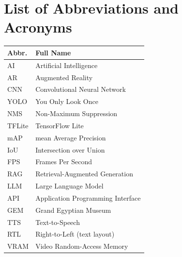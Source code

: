 \chapter*{List of Abbreviations and Acronyms}

\begin{center}
\begin{tabular}{@{}ll@{}}
\toprule
\textbf{Abbr.} & \textbf{Full Name}\\
\midrule
AI     & Artificial Intelligence\\
AR     & Augmented Reality\\
CNN    & Convolutional Neural Network\\
YOLO   & You Only Look Once\\
NMS    & Non-Maximum Suppression\\
TFLite & TensorFlow Lite\\
mAP    & mean Average Precision\\
IoU    & Intersection over Union\\
FPS    & Frames Per Second\\
RAG    & Retrieval-Augmented Generation\\
LLM    & Large Language Model\\
API    & Application Programming Interface\\
GEM    & Grand Egyptian Museum\\
TTS    & Text-to-Speech\\
RTL    & Right-to-Left (text layout)\\
VRAM   & Video Random-Access Memory\\
\bottomrule
\end{tabular}
\end{center}
